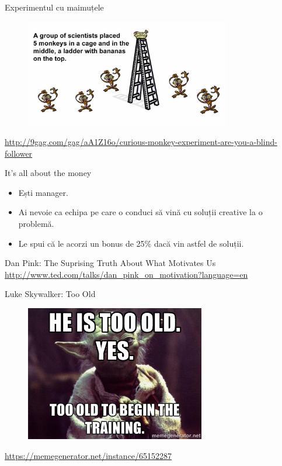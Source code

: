 \documentclass{beamer}
\begin{document}
\begin{frame}{Experimentul cu maimuțele}
  \begin{figure}
    \centering
    \includegraphics[width=0.8\textwidth]{img/monkey-experiment}
  \end{figure}
  \begin{center}
    \tiny
    \url{http://9gag.com/gag/aA1Z16o/curious-monkey-experiment-are-you-a-blind-follower}
  \end{center}
\end{frame}

\begin{frame}{It's all about the money}
  \begin{itemize}
    \pause \item Ești manager.
    \pause \item Ai nevoie ca echipa pe care o conduci să vină cu soluții creative la o problemă.
    \pause \item Le spui că le acorzi un bonus de 25\% dacă vin astfel de soluții.
  \end{itemize}
  \pause
  \begin{center}
    Dan Pink: The Suprising Truth About What Motivates Us\\
    \vspace{3mm}
    \scriptsize
    \url{http://www.ted.com/talks/dan_pink_on_motivation?language=en}
  \end{center}
\end{frame}

\begin{frame}{Luke Skywalker: Too Old}
  \begin{figure}
    \centering
    \includegraphics[width=0.7\textwidth]{img/yoda-too-old}
  \end{figure}
  \begin{center}
    \scriptsize
    \url{https://memegenerator.net/instance/65152287}
  \end{center}
\end{frame}
\end{document}
